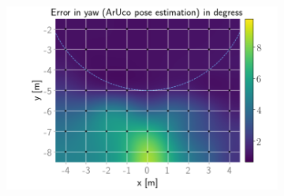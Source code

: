 \documentclass[../Head/report.tex]{subfiles}
\begin{document}
\begin{figure}[H]
    \hspace{-0.9em}
    \begin{subfigure}[t]{.337\textwidth}
        \centering
        \includegraphics[width=\textwidth]{../Figures/GPS2Vision_pose_estimation_test/test2_aruco_board_width_0.3_space_0.15/aruco_pose_estimation_error_yaw.png}
        \caption{}
        \label{fig:GPS2Vision_pose_estimation_test2_error_yaw}
    \end{subfigure}
    \caption{}
    \label{fig:GPS2Vision_pose_estimation_test2_error_ori}
\end{figure}
\end{document}
